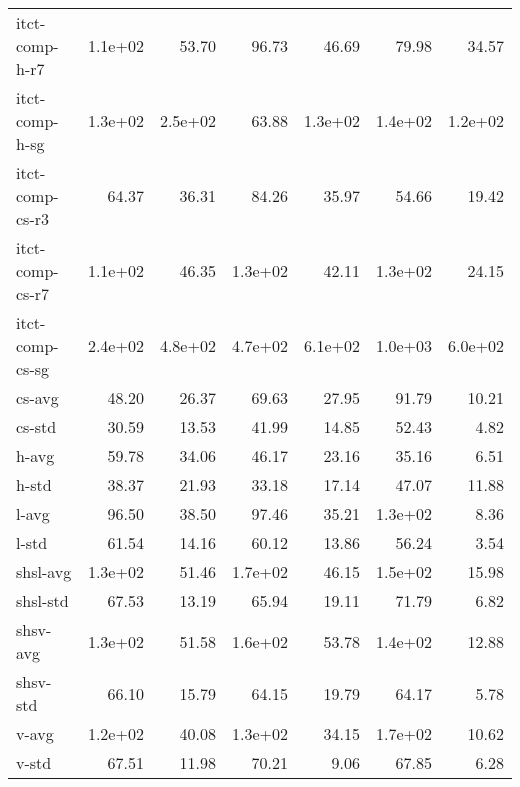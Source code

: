 \begin{tabular}{lrrrrrr}
itct-comp-h-r7      & 1.1e+02 &   53.70 &   96.73 &   46.69 &   79.98 &   34.57 \\
itct-comp-h-sg      & 1.3e+02 & 2.5e+02 &   63.88 & 1.3e+02 & 1.4e+02 & 1.2e+02 \\
itct-comp-cs-r3     &   64.37 &   36.31 &   84.26 &   35.97 &   54.66 &   19.42 \\
itct-comp-cs-r7     & 1.1e+02 &   46.35 & 1.3e+02 &   42.11 & 1.3e+02 &   24.15 \\
itct-comp-cs-sg     & 2.4e+02 & 4.8e+02 & 4.7e+02 & 6.1e+02 & 1.0e+03 & 6.0e+02 \\
cs-avg              &   48.20 &   26.37 &   69.63 &   27.95 &   91.79 &   10.21 \\
cs-std              &   30.59 &   13.53 &   41.99 &   14.85 &   52.43 &    4.82 \\
h-avg               &   59.78 &   34.06 &   46.17 &   23.16 &   35.16 &    6.51 \\
h-std               &   38.37 &   21.93 &   33.18 &   17.14 &   47.07 &   11.88 \\
l-avg               &   96.50 &   38.50 &   97.46 &   35.21 & 1.3e+02 &    8.36 \\
l-std               &   61.54 &   14.16 &   60.12 &   13.86 &   56.24 &    3.54 \\
shsl-avg            & 1.3e+02 &   51.46 & 1.7e+02 &   46.15 & 1.5e+02 &   15.98 \\
shsl-std            &   67.53 &   13.19 &   65.94 &   19.11 &   71.79 &    6.82 \\
shsv-avg            & 1.3e+02 &   51.58 & 1.6e+02 &   53.78 & 1.4e+02 &   12.88 \\
shsv-std            &   66.10 &   15.79 &   64.15 &   19.79 &   64.17 &    5.78 \\
v-avg               & 1.2e+02 &   40.08 & 1.3e+02 &   34.15 & 1.7e+02 &   10.62 \\
v-std               &   67.51 &   11.98 &   70.21 &    9.06 &   67.85 &    6.28 \\
\bottomrule
\end{tabular}
